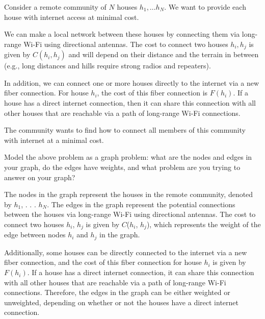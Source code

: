 


\maketitle
\DEFAULTMSG{}

\begin{problem}
Consider a remote community of $N$ houses $h_1, \dots h_N$. We want to provide each house with internet access at minimal cost.

We can make a local network between these houses by connecting them via long-range Wi-Fi using directional antennas. The cost to connect two houses $h_i, h_j$ is given by $C(h_i, h_j)$ and will depend on their distance and the terrain in between (e.g., long distances and hills require strong radios and repeaters).

In addition, we can connect one or more houses directly to the internet via a new fiber connection.  For house $h_i$, the cost of this fiber connection is $F(h_i)$. If a house has a direct internet connection, then it can share this connection with all other houses that are reachable via a path of long-range Wi-Fi connections.

The community wants to find how to connect all members of this community with internet at a minimal cost.
\begin{questions}
\item Model the above problem as a graph problem: what are the nodes and edges in your graph, do the edges have weights, and what problem are you trying to answer on your graph?

The nodes in the graph represent the houses in the remote community, denoted by $h_1$, . . . $h_N$. The edges in the graph represent the potential connections between the houses via long-range Wi-Fi using directional antennas. The cost to connect two houses $h_i$, $h_j$ is given by $C$($h_i$, $h_j$), which represents the weight of the edge between nodes $h_i$ and $h_j$ in the graph.

Additionally, some houses can be directly connected to the internet via a new fiber connection, and the cost of this fiber connection for house $h_i$ is given by $F(h_i)$. If a house has a direct internet connection, it can share this connection with all other houses that are reachable via a path of long-range Wi-Fi connections. Therefore, the edges in the graph can be either weighted or unweighted, depending on whether or not the houses have a direct internet connection.


\end{questions}
\end{problem}
